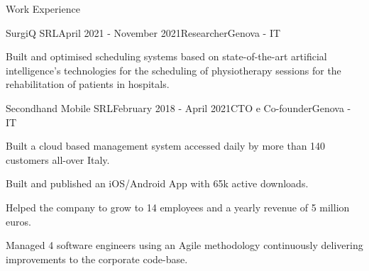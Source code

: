 \documentclass{resume} %
\begin{document}
%
%
%

\begin{rSection}{Work Experience}


\begin{rSubsection}{SurgiQ SRL}{April 2021 - November 2021}{Researcher}{Genova - IT}
\item Built and optimised scheduling systems based on state-of-the-art artificial intelligence's technologies for the scheduling of physiotherapy sessions for the rehabilitation of patients in hospitals.
\end{rSubsection}

\begin{rSubsection}{Secondhand Mobile SRL}{February 2018 - April 2021}{CTO e Co-founder}{Genova - IT}
\item Built a cloud based management system accessed daily by more than 140 customers all-over Italy. 
\item Built and published an iOS/Android App with 65k active downloads. 
\item Helped the company to grow to 14 employees and a yearly revenue of 5 million euros. 
\item Managed 4 software engineers using an Agile methodology continuously delivering improvements to the corporate code-base.
\end{rSubsection}




\end{rSection}



\end{document}
